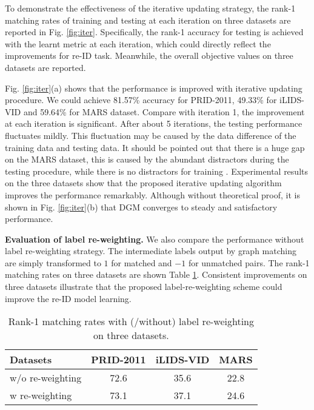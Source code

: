 \documentclass[10pt,twocolumn,letterpaper]{article}
\begin{document}
To demonstrate the effectiveness of the iterative updating strategy, the rank-1 matching rates of training and testing at each iteration on three datasets are reported in Fig. \ref{fig:iter}. Specifically, the rank-1 accuracy for testing is achieved with the learnt metric at each iteration, which could directly reflect the improvements for re-ID task. Meanwhile, the overall objective values on three datasets are reported.

Fig. \ref{fig:iter}(a) shows that the performance is improved with iterative updating procedure. We could achieve 81.57\% accuracy for PRID-2011, 49.33\% for iLIDS-VID and 59.64\% for MARS dataset. Compare with iteration 1, the improvement at each iteration is significant. After about 5 iterations, the testing performance fluctuates mildly. This fluctuation may be caused by the data difference of the training data and testing data. It should be pointed out that there is a huge gap on the MARS dataset, this is caused by the abundant distractors during the testing procedure, while there is no distractors for training \cite{eccv16mars}.
Experimental results on the three datasets show that the proposed iterative updating algorithm improves the performance remarkably. Although without theoretical proof, it is shown in Fig. \ref{fig:iter}(b) that DGM converges to steady and satisfactory performance.

\textbf{Evaluation of label re-weighting.}
We also compare the performance without label re-weighting strategy. The intermediate labels output by graph matching are simply transformed to $1$ for matched and $-1$ for unmatched pairs. The rank-1 matching rates on three datasets are shown Table \ref{tab:reweigh}. Consistent improvements on three datasets illustrate that the proposed label-re-weighting scheme could improve the re-ID model learning.  \begin{table}[t]\small
\centering
  \begin{tabular*}{\columnwidth}{l|ccc}
  \hline
   Datasets & PRID-2011  &iLIDS-VID  & MARS    \\\hline
  w/o re-weighting  & 72.6     &35.6  & 22.8 \\
  w re-weighting    & 73.1  &37.1   & 24.6   \\ \hline
 \end{tabular*}
 \caption{\label{tab:reweigh}\small{Rank-1 matching rates with (/without) label re-weighting on three datasets.}}
\end{table}
\end{document}
